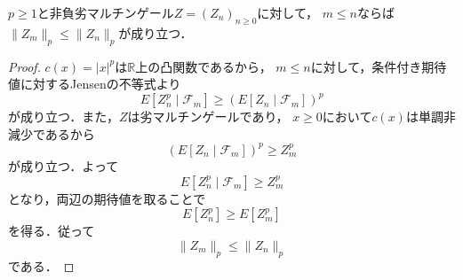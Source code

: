 \documentclass{jsarticle}
\begin{document}
$p\geq1$と非負劣マルチンゲール$Z=(Z_n)_{n\geq0}$に対して，
$m\leq n$ならば$\|Z_m\|_p\leq\|Z_n\|_p$が成り立つ．

\begin{proof}
$c(x)=|x|^p$は$\mathbb{R}$上の凸関数であるから，
$m\leq n$に対して，条件付き期待値に対するJensenの不等式より
\[
E[Z_n^p\mid\mathcal{F}_m]\geq(E[Z_n\mid\mathcal{F}_m])^p
\]
が成り立つ．また，$Z$は劣マルチンゲールであり，
$x\geq0$において$c(x)$は単調非減少であるから
\[
(E[Z_n\mid\mathcal{F}_m])^p\geq Z_m^p
\]
が成り立つ．よって
\[
E[Z_n^p\mid\mathcal{F}_m]\geq Z_m^p
\]
となり，両辺の期待値を取ることで
\[
E[Z_n^p]\geq E[Z_m^p]
\]
を得る．従って
\[
\|Z_m\|_p\leq\|Z_n\|_p
\]
である．
\end{proof}
\end{document}

